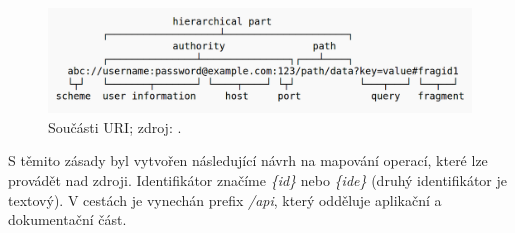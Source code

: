 \begin{figure}[ht!]
  \centering
  \includegraphics[width=130mm]{./images/uri.png}
  \caption{Součásti URI; zdroj: \cite{uri_wiki}.\label{overflow}}
\end{figure}

S těmito zásady byl vytvořen následující návrh na mapování operací, které lze provádět nad zdroji.
Identifikátor značíme \textit{\{id\}} nebo \textit{\{ide\}} (druhý identifikátor je textový).
V cestách je vynechán prefix \textit{/api}, který odděluje aplikační a dokumentační část.

